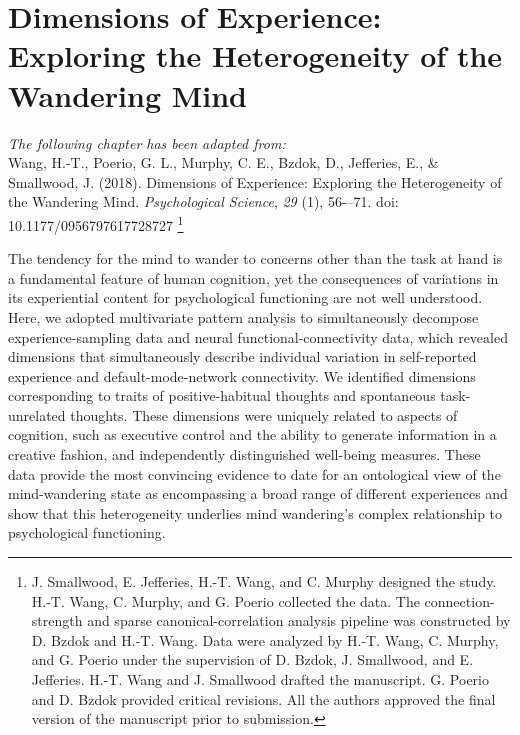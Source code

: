 \chapter{Dimensions of Experience: Exploring the Heterogeneity of the Wandering Mind}
\label{ch:study1}

\textit{The following chapter has been adapted from:\\}
Wang, H.-T., Poerio, G. L., Murphy, C. E., Bzdok, D., Jefferies, E., \& Smallwood, J. (2018). Dimensions of Experience: Exploring the Heterogeneity of the Wandering Mind. \textit{Psychological Science}, \textit{29} (1), 56-–71. doi: 10.1177/0956797617728727
\footnote{
J. Smallwood, E. Jefferies, H.-T. Wang, and C. Murphy designed the study. H.-T. Wang, C. Murphy, and G. Poerio collected the data. The connection-strength and sparse canonical-correlation analysis pipeline was constructed by D. Bzdok and H.-T. Wang. Data were analyzed by H.-T. Wang, C. Murphy, and G. Poerio under the supervision of D. Bzdok, J. Smallwood, and E. Jefferies. H.-T. Wang and J. Smallwood drafted the manuscript. G. Poerio and D. Bzdok provided critical revisions. All the authors approved the final version of the manuscript prior to submission.
}\\

\newpage

\noindent{}The tendency for the mind to wander to concerns other than the task at hand is a fundamental feature of human cognition, yet the consequences of variations in its experiential content for psychological functioning are not well understood. Here, we adopted multivariate pattern analysis to simultaneously decompose experience-sampling data and neural functional-connectivity data, which revealed dimensions that simultaneously describe individual variation in self-reported experience and default-mode-network connectivity. We identified dimensions corresponding to traits of positive-habitual thoughts and spontaneous task-unrelated thoughts. These dimensions were uniquely related to aspects of cognition, such as executive control and the ability to generate information in a creative fashion, and independently distinguished well-being measures. These data provide the most convincing evidence to date for an ontological view of the mind-wandering state as encompassing a broad range of different experiences and show that this heterogeneity underlies mind wandering's complex relationship to psychological functioning.

